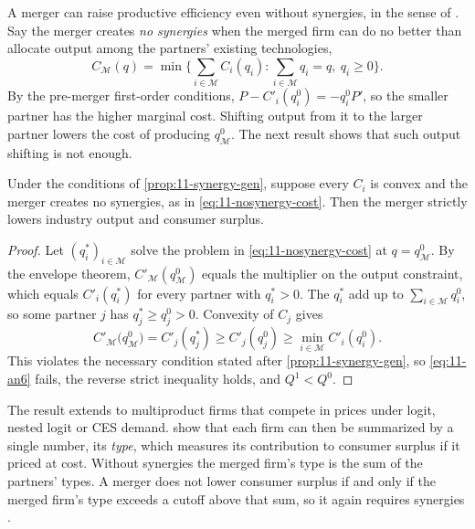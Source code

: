 A merger can raise productive efficiency even without synergies, in the sense of \citet{FarrellShapiro1990}. Say
the merger creates \emph{no synergies} when the merged firm can do no better than allocate output among the
partners' existing technologies,
\begin{equation}\label{eq:11-nosynergy-cost}
C_{\mathcal{M}}(q) = \min\Big\{\sum_{i \in \mathcal{M}}C_i(q_i) : \sum_{i \in \mathcal{M}}q_i = q,\ q_i \ge 0\Big\}.
\end{equation}
By the pre-merger first-order conditions, $P - C'_i(q_i^0) = -q_i^0P'$, so the smaller partner has the higher
marginal cost. Shifting output from it to the larger partner lowers the cost of producing $q_{\mathcal{M}}^0$. The
next result shows that such output shifting is not enough.

\begin{corollary}\label{cor:11-rationalize}
Under the conditions of \cref{prop:11-synergy-gen}, suppose every $C_i$ is convex and the merger creates no
synergies, as in \eqref{eq:11-nosynergy-cost}. Then the merger strictly lowers industry output and consumer surplus.
\end{corollary}

\begin{proof}
Let $(q_i^*)_{i \in \mathcal{M}}$ solve the problem in \eqref{eq:11-nosynergy-cost} at $q = q_{\mathcal{M}}^0$. By
the envelope theorem, $C'_{\mathcal{M}}(q_{\mathcal{M}}^0)$ equals the multiplier on the output constraint, which
equals $C'_i(q_i^*)$ for every partner with $q_i^* > 0$. The $q_i^*$ add up to $\sum_{i \in \mathcal{M}}q_i^0$, so
some partner $j$ has $q_j^* \ge q_j^0 > 0$. Convexity of $C_j$ gives
\begin{equation*}
C'_{\mathcal{M}}\big(q_{\mathcal{M}}^0\big) = C'_j(q_j^*) \ge C'_j(q_j^0) \ge \min_{i \in \mathcal{M}}C'_i(q_i^0) .
\end{equation*}
This violates the necessary condition stated after \cref{prop:11-synergy-gen}, so \eqref{eq:11-an6} fails, the
reverse strict inequality holds, and $Q^1 < Q^0$.
\end{proof}

The result extends to multiproduct firms that compete in prices under logit, nested logit or CES demand.
\citet{NockeSchutz2018,NockeSchutz2019} show that each firm can then be summarized by a single number, its
\emph{type}, which measures its contribution to consumer surplus if it priced at cost. Without synergies the merged
firm's type is the sum of the partners' types. A merger does not lower consumer surplus if and only if the merged
firm's type exceeds a cutoff above that sum, so it again requires synergies \citep[p.~229]{AskerNocke2021}.


